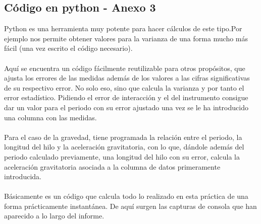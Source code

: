 \documentclass{article}
\begin{document}
\subsection{Código en python - Anexo 3}
Python es una herramienta muy potente para hacer cálculos de este tipo.Por ejemplo nos permite obtener valores para la varianza de una forma mucho más fácil (una vez escrito el código necesario). \\\\ Aquí se encuentra un código fácilmente reutilizable para otros propósitos, que ajusta los errores de las medidas además de los valores a las cifras significativas de su respectivo error. No solo eso, sino que calcula la varianza y por tanto el error estadístico. Pidiendo el error de interacción y el del instrumento consigue dar un valor para el periodo con su error ajustado una vez se le ha introducido una columna con las medidas. \\\\ Para el caso de la gravedad, tiene programada la relación entre el periodo, la longitud del hilo y la aceleración gravitatoria, con lo que, dándole además del periodo calculado previamente, una longitud del hilo con su error, calcula la aceleración gravitatoria asociada a la columna de datos primeramente introducida. \\\\ Básicamente es un código que calcula todo lo realizado en esta práctica de una forma prácticamente instantánea. De aquí surgen las capturas de consola que han aparecido a lo largo del informe.  
\begin{adjustwidth}{-35pt}{-35pt}
\UseRawInputEncoding

\end{adjustwidth}
\end{document}
